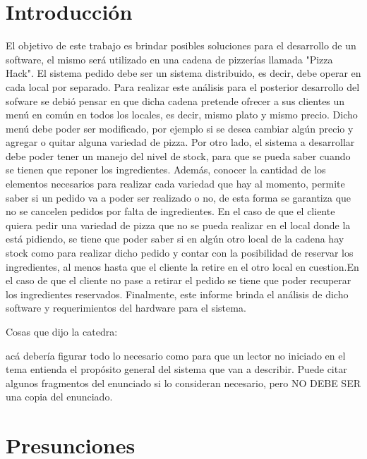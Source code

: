 \documentclass[a4paper,10pt]{article}
\begin{document}
\tableofcontents

\newpage


\section*{Introducci\'on}

El objetivo de este trabajo es brindar posibles soluciones para el desarrollo de un software, el mismo ser\'a utilizado en una cadena de pizzer\'ias llamada "Pizza Hack". El sistema pedido debe ser un sistema distribuido, es decir, debe operar en cada local por separado. Para realizar este an\'alisis para el posterior desarrollo del sofware se debi\'o pensar en que dicha cadena pretende ofrecer a sus clientes un men\'u en com\'un en todos los locales, es decir, mismo plato y mismo precio. Dicho men\'u debe poder ser modificado, por ejemplo si se desea cambiar alg\'un precio y agregar o quitar alguna variedad de pizza. Por otro lado, el sistema a desarrollar debe poder tener un manejo del nivel de stock, para que se pueda saber cuando se tienen que reponer los ingredientes. Adem\'as, conocer la cantidad de los elementos necesarios para realizar cada variedad que hay al momento, permite saber si un pedido va a poder ser realizado o no, de esta forma se garantiza que no se cancelen pedidos por falta de ingredientes. En el caso de que el cliente quiera pedir una variedad de pizza que no se pueda realizar en el local donde la est\'a pidiendo, se tiene que poder saber si en alg\'un otro local de la cadena hay stock como para realizar dicho pedido y contar con la posibilidad de reservar los ingredientes, al menos hasta que el cliente la retire en el otro local en cuestion.En el caso de que el cliente no pase a retirar el pedido se tiene que poder recuperar los ingredientes reservados. Finalmente, este informe brinda el an\'alisis de dicho software y requerimientos del hardware para el sistema.

Cosas que dijo la catedra:

acá debería figurar todo lo necesario como para que un
lector no iniciado en el tema entienda el propósito general del
sistema que van a describir. Puede citar algunos fragmentos del
enunciado si lo consideran necesario, pero NO DEBE SER una copia del
enunciado.

\newpage
\section*{Presunciones}
\end{document}
